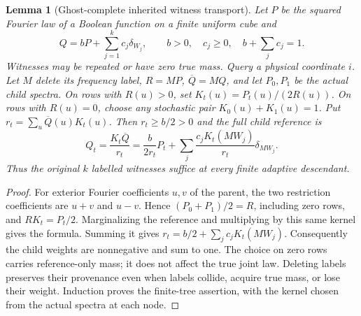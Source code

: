 \documentclass[11pt]{article}
\newtheorem{lemma}{Lemma}
\begin{document}
\begin{lemma}[Ghost-complete inherited witness transport]
\label{lem:v11-ghost}
Let $P$ be the squared Fourier law of a Boolean function on a finite uniform cube and
\[
 Q=bP+\sum_{j=1}^k c_j\delta_{W_j},\qquad
 b>0,\quad c_j\geq0,\quad b+\sum_jc_j=1.
\]
Witnesses may be repeated or have zero true mass. Query a physical coordinate $i$.
Let $M$ delete its frequency label, $R=MP$, $\overline Q=MQ$, and let $P_0,P_1$
be the actual child spectra. On rows with $R(u)>0$, set $K_t(u)=P_t(u)/(2R(u))$.
On rows with $R(u)=0$, choose any stochastic pair $K_0(u)+K_1(u)=1$.
Put $r_t=\sum_u\overline Q(u)K_t(u)$. Then $r_t\geq b/2>0$ and the full child reference is
\[
 Q_t=\frac{K_t\overline Q}{r_t}
 =\frac b{2r_t}P_t+
 \sum_j\frac{c_jK_t(MW_j)}{r_t}\delta_{MW_j}.
\]
Thus the original $k$ labelled witnesses suffice at every finite adaptive descendant.
\end{lemma}
\begin{proof}
For exterior Fourier coefficients $u,v$ of the parent, the two restriction coefficients
are $u+v$ and $u-v$. Hence $(P_0+P_1)/2=R$, including zero rows, and $RK_t=P_t/2$.
Marginalizing the reference and multiplying by this same kernel gives the formula.
Summing it gives $r_t=b/2+\sum_jc_jK_t(MW_j)$. Consequently the child weights are
nonnegative and sum to one. The choice on zero rows carries reference-only mass; it
does not affect the true joint law. Deleting labels preserves their provenance even
when labels collide, acquire true mass, or lose their weight. Induction proves the
finite-tree assertion, with the kernel chosen from the actual spectra at each node.
\end{proof}
\end{document}
